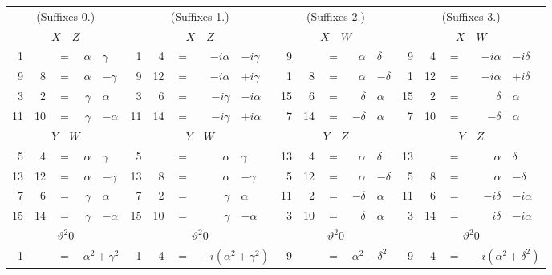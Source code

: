 \documentclass[11pt]{article}
\begin{document}
\smallskip
{\footnotesize
\begin{center}
\begin{tabular}{rrcrl||rrcrl||rrcrl||rrcrl}
\multicolumn{5}{c||}{(Suffixes 0.)} & \multicolumn{5}{c||}{(Suffixes 1.)} & \multicolumn{5}{c||}{(Suffixes 2.)} & \multicolumn{5}{c}{(Suffixes 3.)}\\
\multicolumn{5}{c||}{$X\quad Z$} & \multicolumn{5}{c||}{$X\quad Z$} & \multicolumn{5}{c||}{$X\quad W$} & \multicolumn{5}{c}{$X\quad W$}\\\hline
1 & & $=$ & $\alpha$ & $\gamma$ & 1 & 4 & $=$ & $-i\alpha$ & $-i\gamma$ & 9 & & $=$ & $\alpha$ & $\delta$ & 9 & 4 & $=$ & $-i\alpha$ & $-i\delta$\\
9 & 8 & $=$ & $\alpha$ & $-\gamma$ & 9 & 12 & $=$ & $-i\alpha$ & $+i\gamma$ & 1 & 8 & $=$ & $\alpha$ & $-\delta$ & 1 & 12 & $=$ & $-i\alpha$ & $+i\delta$\\
3 & 2 & $=$ & $\gamma$ & $\alpha$ & 3 & 6 & $=$ & $-i\gamma$ & $-i\alpha$ & 15 & 6 & $=$ & $\delta$ & $\alpha$ & 15 & 2 & $=$ & $\delta$ & $\alpha$\\
11 & 10 & $=$ & $\gamma$ & $-\alpha$ & 11 & 14 & $=$ & $-i\gamma$ & $+i\alpha$ & 7 & 14 & $=$ & $-\delta$ & $\alpha$ & 7 & 10 & $=$ & $-\delta$ & $\alpha$\\\hline
\multicolumn{5}{c||}{$Y\quad W$} & \multicolumn{5}{c||}{$Y\quad W$} & \multicolumn{5}{c||}{$Y\quad Z$} & \multicolumn{5}{c}{$Y\quad Z$}\\
5 & 4 & $=$ & $\alpha$ & $\gamma$ & 5 & & $=$ & $\alpha$ & $\gamma$ & 13 & 4 & $=$ & $\alpha$ & $\delta$ & 13 & & $=$ & $\alpha$ & $\delta$\\
13 & 12 & $=$ & $\alpha$ & $-\gamma$ & 13 & 8 & $=$ & $\alpha$ & $-\gamma$ & 5 & 12 & $=$ & $\alpha$ & $-\delta$ & 5 & 8 & $=$ & $\alpha$ & $-\delta$\\
7 & 6 & $=$ & $\gamma$ & $\alpha$ & 7 & 2 & $=$ & $\gamma$ & $\alpha$ & 11 & 2 & $=$ & $-\delta$ & $\alpha$ & 11 & 6 & $=$ & $-i\delta$ & $-i\alpha$\\
15 & 14 & $=$ & $\gamma$ & $-\alpha$ & 15 & 10 & $=$ & $\gamma$ & $-\alpha$ & 3 & 10 & $=$ & $\delta$ & $\alpha$ & 3 & 14 & $=$ & $i\delta$ & $-i\alpha$\\\hline
\multicolumn{5}{c||}{$\vartheta^2 0$} & \multicolumn{5}{c||}{$\vartheta^2 0$} & \multicolumn{5}{c||}{$\vartheta^2 0$} & \multicolumn{5}{c}{$\vartheta^2 0$}\\
1 & & $=$ & \multicolumn{2}{l||}{$\alpha^2 + \gamma^2$} & 1 & 4 & $=$ & \multicolumn{2}{l||}{$-i(\alpha^2 + \gamma^2)$} & 9 & & $=$ & \multicolumn{2}{l||}{$\alpha^2 - \delta^2$} & 9 & 4 & $=$ & \multicolumn{2}{l}{$-i(\alpha^2 + \delta^2)$}\\

\end{tabular}
\end{center}}
\end{document}
